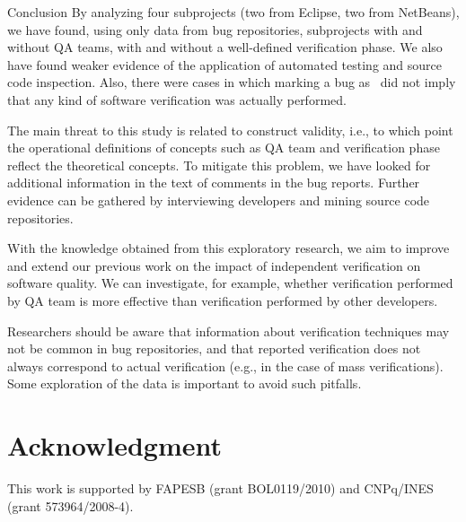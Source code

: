 \begin{section}{Conclusion} \label{sec:conclusion}
	By analyzing four subprojects (two from Eclipse, two from NetBeans), we have found, using only data from bug repositories, subprojects with and without QA teams, with and without a well-defined verification phase. We also have found weaker evidence of the application of automated testing and source code inspection. Also, there were cases in which marking a bug as \VERIFIED\ did not imply that any kind of software verification was actually performed.
			
	The main threat to this study is related to construct validity, i.e., to which point the operational definitions of concepts such as QA team and verification phase reflect the theoretical concepts. To mitigate this problem, we have looked for additional information in the text of comments in the bug reports. Further evidence can be gathered by interviewing developers and mining source code repositories.
	
	With the knowledge obtained from this exploratory research, we aim to improve and extend our previous work on the impact of independent verification on software quality. We can investigate, for example, whether verification performed by QA team is more effective than verification performed by other developers.
	
	Researchers should be aware that information about verification techniques may not be common in bug repositories, and that reported verification does not always correspond to actual verification (e.g., in the case of mass verifications). Some exploration of the data is important to avoid such pitfalls.
	
	
\end{section}

\section*{Acknowledgment}

\small{This work is supported by FAPESB (grant BOL0119/2010) and CNPq/INES (grant 573964/2008-4).}
